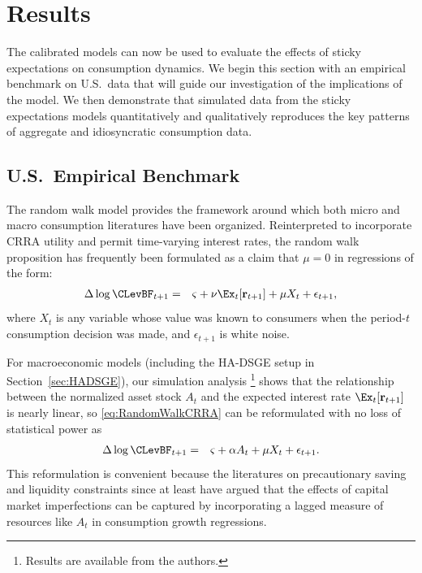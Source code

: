 \documentclass[titlepage]{\econtex}\newcommand{\texname}{cAndCwithStickyE}
\begin{document}
\section{Results}\label{sec:Results}

The calibrated models can now be used to evaluate the effects of sticky expectations on consumption dynamics.  We begin this section with an empirical benchmark on U.S.\ data that will guide our investigation of the implications of the model.  We then demonstrate that simulated data from the sticky expectations models quantitatively and qualitatively reproduces the key patterns of aggregate and idiosyncratic consumption data.

\subsection{U.S.\ Empirical Benchmark}
\label{sec:EmpBenchmark}

The random walk model provides the framework around which both micro and macro consumption literatures have been organized.  Reinterpreted to incorporate CRRA utility and permit time-varying interest rates, the random walk proposition has frequently been formulated as a claim that $\mu=0$ in regressions of the form:
\begin{eqnarray}
  \label{eq:RandomWalkCRRA}
  \Delta \log \CLevBF_{t+1} & = & \varsigma+\nu \Ex_{t}[\mathbf{r}_{t+1}]+\mu X_{t}+\epsilon_{t+1},
\end{eqnarray}
where $X_{t}$ is any variable whose value was known to consumers
when the period-$t$ consumption decision was made, and $\epsilon_{t+1}$
is white noise.

For macroeconomic models (including the HA-DSGE setup in Section~\ref{sec:HADSGE}), our simulation analysis
\footnote{Results are available from the authors.}
shows that the relationship between the normalized asset stock $A_{t}$ and the expected interest rate $\Ex_{t}[\mathbf{r}_{t+1}]$ is nearly linear, so \eqref{eq:RandomWalkCRRA} can be reformulated with no loss of statistical power as
\begin{eqnarray*}
  \label{eq:RandomWalkAForm}
  \Delta \log \CLevBF_{t+1} & = & \varsigma+\alpha A_{t}+\mu X_{t}+\epsilon_{t+1}.
\end{eqnarray*}
This reformulation is convenient because the literatures on precautionary saving and liquidity constraints since at least \cite{zeldes:jpe,zeldesStochastic} have argued that the effects of capital market imperfections can be captured by incorporating a lagged measure of resources like $A_{t}$ in consumption growth regressions.
\end{document}
